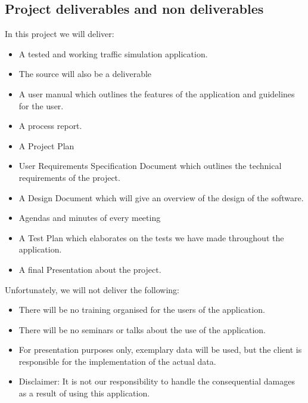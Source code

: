 \documentclass[a4paper,11pt]{article}
\begin{document}
    \subsection{Project deliverables and non deliverables  }
    In this project we will deliver: 
    \begin{itemize}
    \item A tested and working traffic simulation application.
    \item The source will also be a deliverable
    \item A user manual which outlines the features of the application and guidelines for the user.
    \item A process report.
    \item A Project Plan
    \item User Requirements Specification Document which outlines the technical requirements of the project.
    \item A Design Document which will give an overview of the design of the software.  
    \item Agendas and minutes of every meeting
    \item A Test Plan which elaborates on the tests we have made throughout the application.
    \item A final Presentation about the project.
    \end{itemize}
   
    
    Unfortunately, we will not deliver the following:
    \begin{itemize}
    \item There will be no training organised for the users of the application.
    \item There will be no seminars or talks about the use of the application.
    \item For presentation purposes only, exemplary data will be used, but the client is responsible for the implementation of the actual data. 
    \item Disclaimer: It is not our responsibility to handle the consequential damages as a result of using this application.
    
    \end{itemize}
    
         
       
\end{document}
